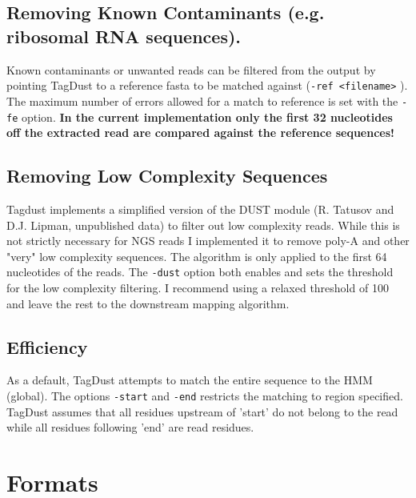 \documentclass[11pt,a4paper,oneside]{book}
\begin{document}
\subsection{Removing Known Contaminants (e.g. ribosomal RNA sequences).}
Known contaminants or unwanted reads can be filtered from the output by pointing TagDust to a reference fasta to be matched against ({\tt -ref <filename>} ). The maximum number of errors allowed for a match to reference is set with the {\tt -fe} option. {\bf In the current implementation only the first 32 nucleotides off the extracted read are compared against the reference sequences!}
\subsection{Removing Low Complexity Sequences}
Tagdust implements a simplified version of the DUST module (R. Tatusov and D.J. Lipman, unpublished data) to filter out low complexity reads. While this is not strictly necessary for NGS reads I implemented it to remove poly-A and other "very" low complexity sequences. The algorithm is only applied to the first 64 nucleotides of the reads. The {\tt -dust} option both enables and sets the threshold for the low complexity filtering. I recommend using a relaxed threshold of 100 and leave the rest to the downstream mapping algorithm. 


\subsection{Efficiency}
As a default, TagDust attempts to match the entire sequence to the HMM (global). The options {\tt -start} and {\tt -end} restricts the matching to region specified. TagDust assumes that all residues upstream of 'start' do not belong to the read while all residues following 'end' are read residues.






\section{Formats}
\end{document}
